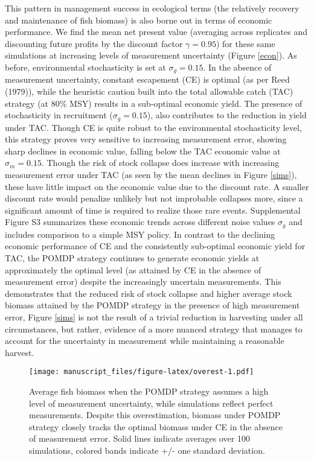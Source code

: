 \documentclass[3p]{elsarticle} %
\makeatletter
\def\maxwidth{\ifdim\Gin@nat@width>\linewidth\linewidth
\else\Gin@nat@width\fi}
\let\Oldincludegraphics\includegraphics
\renewcommand{\includegraphics}[1]{\Oldincludegraphics[width=\maxwidth]{#1}}
\makeatother
\begin{document}
This pattern in management success in ecological terms (the relatively
recovery and maintenance of fish biomass) is also borne out in terms of
economic performance. We find the mean net present value (averaging
across replicates and discounting future profits by the discount factor
\(\gamma = 0.95\)) for these same simulations at increasing levels of
measurement uncertainty (Figure \ref{econ}). As before, environmental
stochasticity is set at \(\sigma_g = 0.15\). In the absence of
measurement uncertainty, constant escapement (CE) is optimal (as per
Reed (1979)), while the heuristic caution built into the total allowable
catch (TAC) strategy (at 80\% MSY) results in a sub-optimal economic
yield. The presence of stochasticity in recruitment
(\(\sigma_g = 0.15\)), also contributes to the reduction in yield under
TAC. Though CE is quite robust to the environmental stochasticity level,
this strategy proves very sensitive to increasing measurement error,
showing sharp declines in economic value, falling below the TAC economic
value at \(\sigma_m = 0.15\). Though the risk of stock collapse does
increase with increasing measurement error under TAC (as seen by the
mean declines in Figure \ref{sims}), these have little impact on the
economic value due to the discount rate. A smaller discount rate would
penalize unlikely but not improbable collapses more, since a significant
amount of time is required to realize those rare events. Supplemental
Figure S3 summarizes these economic trends across different noise values
\(\sigma_g\) and includes comparison to a simple MSY policy. In contrast
to the declining economic performance of CE and the consistently
sub-optimal economic yield for TAC, the POMDP strategy continues to
generate economic yields at approximately the optimal level (as attained
by CE in the absence of measurement error) despite the increasingly
uncertain measurements. This demonstrates that the reduced risk of stock
collapse and higher average stock biomass attained by the POMDP strategy
in the presence of high measurement error, Figure \ref{sims} is not the
result of a trivial reduction in harvesting under all circumstances, but
rather, evidence of a more nuanced strategy that manages to account for
the uncertainty in measurement while maintaining a reasonable harvest.

\begin{figure}
\centering
\texttt{[image: manuscript\_files/figure-latex/overest-1.pdf]}
\caption{Average fish biomass when the POMDP strategy assumes a high
level of measurement uncertainty, while simulations reflect perfect
measurements. Despite this overestimation, biomass under POMDP strategy
closely tracks the optimal biomass under CE in the absence of
measurement error. Solid lines indicate averages over 100 simulations,
colored bands indicate +/- one standard deviation. \label{overest}}
\end{figure}
\end{document}
